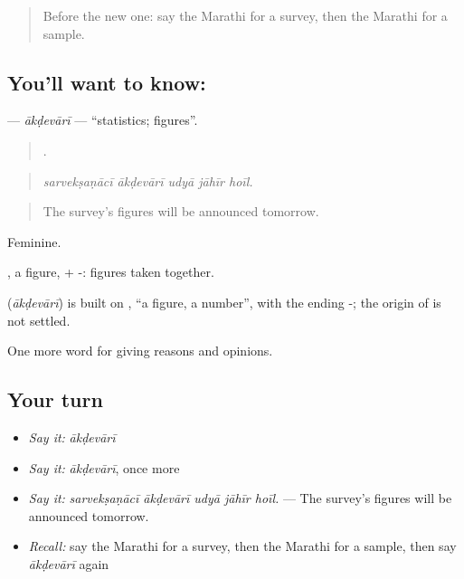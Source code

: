 \label{lesson:MR-C373-akdevari}



\begin{quote}
Before the new one: say the Marathi for a survey, then the Marathi for a sample.
\end{quote}

\subsection*{You'll want to know: }
\textbf{} — \emph{ākḍevārī} — \textquotedblleft{}statistics; figures\textquotedblright{}.

\begin{quote}
    .
\end{quote}

\begin{quote}
\emph{sarvekṣaṇācī ākḍevārī udyā jāhīr hoīl.}
\end{quote}

\begin{quote}
The survey's figures will be announced tomorrow.
\end{quote}

Feminine.

, a figure, + -: figures taken together.

\begin{cousinweb}
\textbf{} (\emph{ākḍevārī}) is built on , \textquotedblleft{}a figure, a number\textquotedblright{}, with the ending -; the origin of  is not settled.
\end{cousinweb}

\begin{grammarlens}[title={What you've built}]
One more word for giving reasons and opinions.
\end{grammarlens}

\subsection*{Your turn}
\begin{itemize}
\raggedright
  \item \emph{Say it:} \emph{ākḍevārī}
  \item \emph{Say it:} \emph{ākḍevārī}, once more
  \item \emph{Say it:} \emph{sarvekṣaṇācī ākḍevārī udyā jāhīr hoīl.} — The survey's figures will be announced tomorrow.
  \item \emph{Recall:} say the Marathi for a survey, then the Marathi for a sample, then say \emph{ākḍevārī} again
\end{itemize}

